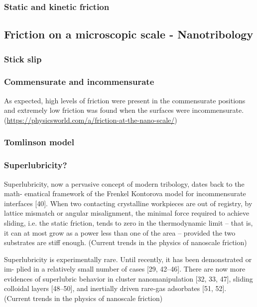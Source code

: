 \subsubsection{Static and kinetic friction} %

\subsection{Friction on a microscopic scale - Nanotribology}
\subsubsection{Stick slip}

\subsubsection{Commensurate and incommensurate}
As expected, high levels of friction were present in the commensurate positions and extremely low friction was found when the surfaces were incommensurate. (\url{https://physicsworld.com/a/friction-at-the-nano-scale/})


\subsubsection{Tomlinson model}
\subsubsection{Superlubricity?}
Superlubricity, now a pervasive concept of modern tribology, dates back to the math- ematical framework of the Frenkel Kontorova model for incommensurate interfaces [40]. When two contacting crystalline workpieces are out of registry, by lattice mismatch or angular misalignment, the minimal force required to achieve sliding, i.e. the static friction, tends to zero in the thermodynamic limit – that is, it can at most grow as a power less than one of the area – provided the two substrates are stiff enough. (Current trends in the physics of nanoscale friction)


Superlubricity is experimentally rare. Until recently, it has been demonstrated or im- plied in a relatively small number of cases [29, 42–46]. There are now more evidences of superlubric behavior in cluster nanomanipulation [32, 33, 47], sliding colloidal layers [48–50], and inertially driven rare-gas adsorbates [51, 52]. (Current trends in the physics of nanoscale friction)


